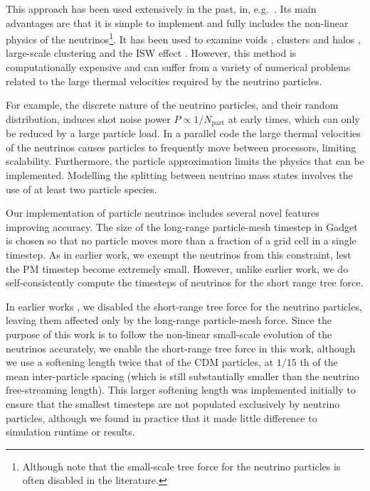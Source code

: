 \documentclass[useAMS, usenatbib]{mnras}
\begin{document}
This approach has been used extensively in the past, in, e.g.~\cite{Brandbyge_2008, Bird_2012, Inman_2017, FVN_2017}. Its main advantages are that it is simple to implement and fully includes the non-linear physics of the
neutrinos\footnote{Although note that the small-scale tree force for the neutrino particles is often disabled in the literature.}. It has been used to examine voids \citep{Massara_2015}, clusters and halos \citep{FVN_2014, Castorina_2014, Costanzi_2013}, large-scale clustering \citep{Castorina_2015} and the ISW effect \citep{Carbone_2016}.
However, this method is computationally expensive and can suffer from a variety of numerical problems related to the large thermal velocities required by the neutrino particles.

For example, the discrete nature of the neutrino particles, and their random distribution, induces shot noise power $P \propto 1/N_\mathrm{part}$ at early times, which can only be reduced by a large particle load. In a parallel code the large thermal velocities of the neutrinos causes particles to frequently move between processors, limiting scalability. Furthermore, the particle approximation limits the physics that can be implemented. Modelling the splitting between neutrino mass states involves the use of at least two particle species.

Our implementation of particle neutrinos includes several novel features improving accuracy. The size of the long-range particle-mesh timestep in Gadget is chosen so that no particle moves more than a fraction of a grid cell in a single timestep. As in earlier work, we exempt the neutrinos from this constraint, lest the PM timestep become extremely small. However, unlike earlier work, we do self-consistently compute the timesteps of neutrinos for the short range tree force.

In earlier works \citep{Bird_2012}, we disabled the short-range tree force for the neutrino particles, leaving them affected only by the long-range particle-mesh force. Since the purpose of this work is to follow the non-linear small-scale evolution of the neutrinos accurately, we enable the short-range tree force in this work, although we use a softening length
twice that of the CDM particles, at $1/15$ th of the mean inter-particle spacing (which is still substantially smaller than the neutrino free-streaming length). This larger softening length was implemented initially to ensure that the smallest timesteps are not populated exclusively by neutrino particles, although we found in practice that it made little difference to simulation runtime or results.
\end{document}

